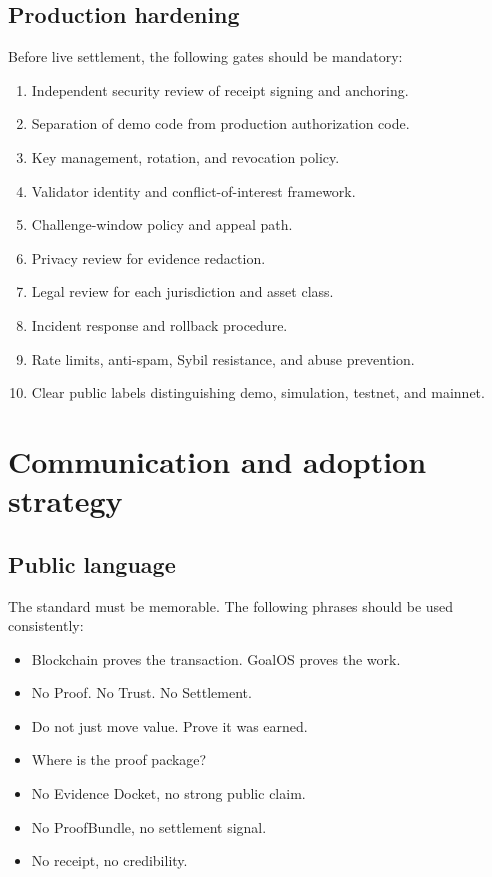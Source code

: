 \subsection{Production hardening}

Before live settlement, the following gates should be mandatory:

\begin{enumerate}
  \item Independent security review of receipt signing and anchoring.
  \item Separation of demo code from production authorization code.
  \item Key management, rotation, and revocation policy.
  \item Validator identity and conflict-of-interest framework.
  \item Challenge-window policy and appeal path.
  \item Privacy review for evidence redaction.
  \item Legal review for each jurisdiction and asset class.
  \item Incident response and rollback procedure.
  \item Rate limits, anti-spam, Sybil resistance, and abuse prevention.
  \item Clear public labels distinguishing demo, simulation, testnet, and mainnet.
\end{enumerate}

\section{Communication and adoption strategy}

\subsection{Public language}

The standard must be memorable. The following phrases should be used consistently:

\begin{itemize}
  \item Blockchain proves the transaction. GoalOS proves the work.
  \item No Proof. No Trust. No Settlement.
  \item Do not just move value. Prove it was earned.
  \item Where is the proof package?
  \item No Evidence Docket, no strong public claim.
  \item No ProofBundle, no settlement signal.
  \item No receipt, no credibility.
\end{itemize}

